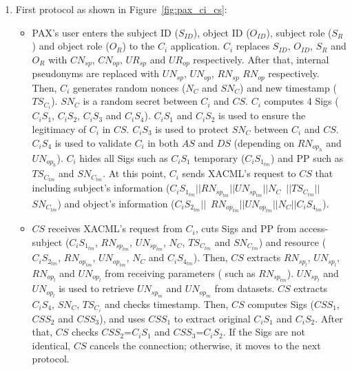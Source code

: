 \documentclass[journal,article,submit,moreauthors,pdftex]{Definitions/mdpi}
\makeatletter
\newcommand\notsotiny{\@setfontsize\notsotiny{6.31415}{7.1828}}
\makeatother
\begin{document}
\begin{itemize}
\begin{itemize}[topsep=0pt,itemsep=-1ex,partopsep=1ex,parsep=1ex]
\begin{itemize} [topsep=0pt,itemsep=-1ex,partopsep=1ex,parsep=1ex]
\begin{enumerate}
\item First protocol as shown in Figure~\ref{fig:pax_ci_cs}:
\begin{itemize}
\item PAX's user enters the subject ID ($S_{ID}$), object ID ($O_{ID}$), subject role ($S_R$) and object role ($O_R$) to the $C_i$ application. $C_i$ replaces $S_{ID}$, $O_{ID}$, $S_R$ and $O_R$ with $CN_{sp}$, $CN_{op}$, $UR_{sp}$ and $UR_{op}$ respectively. After that, internal pseudonyms are replaced with $UN_{sp}$, $UN_{op}$, $RN_{sp}$ $RN_{op}$ respectively. Then, $C_i$ generates random nonces ($N_C$ and $SN_C$) and new timestamp ($TS_{C_i}$). $SN_C$ is a random secret between $C_i$ and $CS$. $C_i$ computes 4 Sigs ($C_iS_1$, $C_iS_2$, $C_iS_3$ and $C_iS_4$). $C_iS_1$ and $C_iS_2$ is used to ensure the legitimacy of $C_i$ in $CS$. $C_iS_3$ is used to protect $SN_C$ between $C_i$ and $CS$. $C_iS_4$ is used to validate $C_i$ in both $AS$ and $DS$ (depending on $RN_{op_h}$ and $UN_{op_h}$). $C_i$ hides all Sigs such as $C_iS_1$ temporary ($C_iS_{1_{tm}}$) and PP such as $TS_{C_{tm}}$ and $SN_{C_{tm}}$. At this point, $C_i$ sends XACML's request to $CS$ that including subject's information ($C_iS_{1_{tm}}||RN_{sp_{tm}}||UN_{sp_{tm}}||N_{C}$\ $||TS_{C_{tm}}||$\ $SN_{C_{tm}}$) and object's information ($C_iS_{2_{tm}}||$\ $RN_{op_{tm}}||UN_{op_{tm}}||N_{C}||C_iS_{4_{tm}}$).
\item $CS$ receives XACML's request from $C_i$, cuts Sigs and PP from access-subject ($C_iS_{1_{tm}}$, $RN_{sp_{tm}}$, $UN_{sp_{tm}}$, $N_{C}$, $TS_{C_{tm}}$ and $SN_{C_{tm}}$) and resource ($C_iS_{2_{tm}}$, $RN_{op_{tm}}$, $UN_{op_{tm}}$, $N_{C}$  and $C_iS_{4_{tm}}$). Then, $CS$ extracts $RN_{sp_l}$, $UN_{sp_l}$, $RN_{op_l}$ and $UN_{op_l}$ from receiving parameters ( such as $RN_{sp_{tm}}$). $UN_{sp_l}$ and $UN_{op_l}$ is used to retrieve $UN_{sp_m}$ and $UN_{op_m}$ from datasets. $CS$ extracts $C_iS_4$, $SN_C$, $TS_{C_i}$ and checks timestamp. Then, $CS$ computes Sigs ($CSS_1$, $CSS_2$ and $CSS_3$), and uses $CSS_1$ to extract original $C_iS_1$ and $C_iS_2$. After that, $CS$ checks $CSS_2$=$C_iS_1$ and $CSS_3$=$C_iS_2$. If the Sigs are not identical, $CS$ cancels the connection; otherwise, it moves to the next protocol.
\end{itemize}
\begin{figure}[ht]
\centering
\scriptsize
{}
\end{figure}
\end{enumerate}
\end{itemize}
\end{itemize}
\end{itemize}
\end{document}
